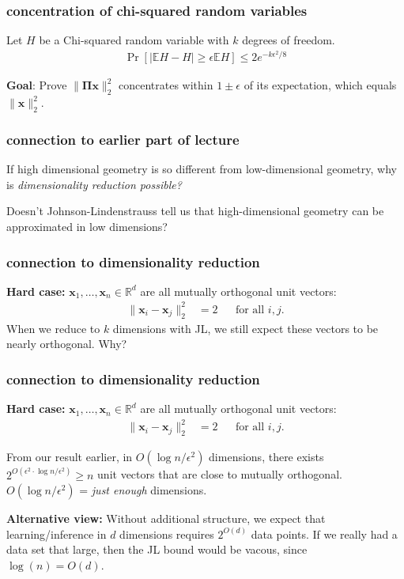 \documentclass[compress]{beamer}
\newcommand{\bs}[1]{\boldsymbol{#1}}
\newcommand{\bv}[1]{\mathbf{#1}}
\newcommand{\R}{\mathbb{R}}
\newcommand{\E}{\mathbb{E}}
\begin{document}
\begin{frame}[t]
	\frametitle{concentration of chi-squared random variables}
	\begin{lemma} Let $H$ be a Chi-squared random variable with $k$ degrees of freedom. 
		\begin{align*}
			\Pr[|\E H - H| \geq \epsilon \E H] \leq 2 e^{-k\epsilon^2/8}
		\end{align*}
	\end{lemma}
	
	\vspace{8em}
	\begin{block}{\vspace*{-3ex}}
		\small \textbf{Goal}: Prove $\|\bs{\Pi} \bv{x} \|_2^2$ concentrates within $1 \pm \epsilon$ of its expectation, which equals $\|\bv{x} \|_2^2$.
	\end{block}
\end{frame}

\begin{frame}
	\frametitle{connection to earlier part of lecture}
	If high dimensional geometry is so different from low-dimensional geometry, why is \emph{dimensionality reduction possible?} 
	
	Doesn't Johnson-Lindenstrauss tell us that high-dimensional geometry can be approximated in low dimensions?
\end{frame}

\begin{frame}[t]
	\frametitle{connection to dimensionality reduction}
	\textbf{Hard case:} $\bv{x}_1, \ldots, \bv{x}_n \in \R^d$ are all mutually orthogonal unit vectors: 
	\begin{align*}
		\|\bv{x}_i - \bv{x}_j\|_2^2 &= 2 & &\text{for all $i,j$.}  
	\end{align*}
	When we reduce to $k$ dimensions with JL, we still expect these vectors to be nearly orthogonal. Why?
	
\end{frame}

\begin{frame}[t]
	\frametitle{connection to dimensionality reduction}
	\textbf{Hard case:} $\bv{x}_1, \ldots, \bv{x}_n \in \R^d$ are all mutually orthogonal unit vectors: 
	\begin{align*}
		\|\bv{x}_i - \bv{x}_j\|_2^2 &= 2 & &\text{for all $i,j$.}  
	\end{align*}
	
	From our result earlier, in $O(\log n /\epsilon^2)$ dimensions, there exists $2^{O(\epsilon^2\cdot \log n /\epsilon^2)} \geq n $ unit vectors that are close to mutually orthogonal.
	\alert{$O(\log n /\epsilon^2)$ = \emph{just enough} dimensions.}
	\vspace{2em}
	
	\textbf{Alternative view:} Without additional structure, we expect that learning/inference in $d$ dimensions requires $2^{O(d)}$ data points. If we really had a data set that large, then the JL bound would be vacous, since $\log(n) = O(d)$.
\end{frame}
\end{document}

